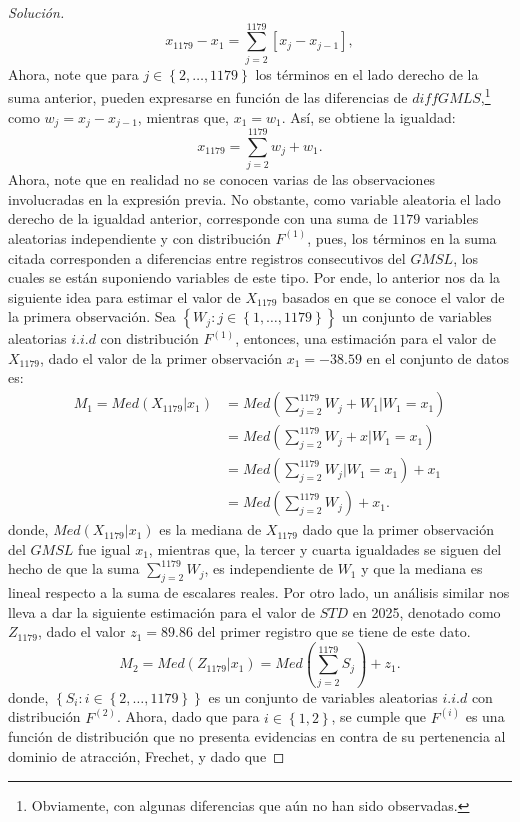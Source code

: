 \documentclass[10.5pt,notitlepage]{article}
\newenvironment{solucion}
  {\begin{proof}[Solución]}
  {\end{proof}}
\newcommand{\corch}[1]{\left[ #1 \right]}
\newcommand{\kis}[1]{\left\{ #1 \right\}}
\newcommand{\pare}[1]{\left( #1 \right)}
\theoremstyle{plain}
\begin{document}
\begin{solucion}
\[
x_{1179} - x_{1} = \sum_{j = 2}^{1179}\corch{x_{j} - x_{j-1}},
\]
Ahora, note que para \(j \in \kis{2,\hdots,1179}\) los términos en el lado derecho de la suma anterior, pueden expresarse en función de las diferencias de \(diffGMLS\),\footnote{Obviamente, con algunas diferencias que aún no han sido observadas.} como \(w_{j} = x_{j} - x_{j-1}\), mientras que, \(x_1 = w_1\). Así, se obtiene la igualdad:
\[
x_{1179}= \sum_{j = 2}^{1179}w_{j} + w_{1}.
\]
Ahora, note que en realidad no se conocen varias de las observaciones involucradas en la expresión previa. No obstante, como variable aleatoria el lado derecho de la igualdad anterior, corresponde con una suma de \(1179\) variables aleatorias independiente y con distribución \(F^{(1)}\), pues, los términos en la suma citada corresponden a diferencias entre registros consecutivos del \(GMSL\), los cuales se están suponiendo variables de este tipo. Por ende, lo anterior nos da la siguiente idea para estimar el valor de \(X_{1179}\) basados en que se conoce el valor de la primera observación. Sea \(\kis{W_{j}:j \in \kis{1,\hdots,1179}}\) un conjunto de variables aleatorias \(i.i.d\) con distribución \(F^{(1)}\), entonces, una estimación para el valor de \(X_{1179}\), dado el valor de la primer observación \(x_1 = -38.59\) en el conjunto de datos es: 
\begin{align}
M_1 = Med(X_{1179} | x_1) &= Med\pare{\sum_{j = 2}^{1179}W_{j} + W_{1}| W_{1} = x_1}\nonumber\\
                    &= Med\pare{\sum_{j = 2}^{1179}W_{j} + x| W_{1} = x_1}\nonumber\\
                    &= Med\pare{\sum_{j = 2}^{1179}W_{j}| W_{1} = x_1} + x_1\nonumber\\ 
                    &= Med\pare{\sum_{j = 2}^{1179}W_{j}}  + x_1. 
\end{align}
donde, \(Med(X_{1179} | x_1)\) es la mediana de \(X_{1179}\) dado que la primer observación del \(GMSL\) fue igual \(x_1\), mientras que, la tercer y cuarta igualdades se siguen del hecho de que la suma \(\sum_{j = 2}^{1179}W_{j}\), es independiente de \(W_{1}\) y que la mediana es lineal respecto a la suma de escalares reales. Por otro lado, un análisis similar nos lleva a dar la siguiente estimación para el valor de \(STD\) en 2025, denotado como \(Z_{1179}\), dado el valor \(z_1 = 89.86\) del primer registro que se tiene de este dato. 
\[
M_2= Med\pare{Z_{1179} | x_1} = Med\pare{\sum_{j = 2}^{1179}S_{j}}  + z_1. 
\]
donde, \(\kis{S_i : i \in \kis{2, \hdots,1179}}\) es un conjunto de variables aleatorias \(i.i.d\) con distribución \(F^{(2)}\). Ahora, dado que para \(i \in \kis{1,2}\), se cumple que \(F^{(i)}\) es una función de distribución que no presenta evidencias en contra de su pertenencia al dominio de atracción, Frechet, y dado que 

\end{solucion}
\end{document}
